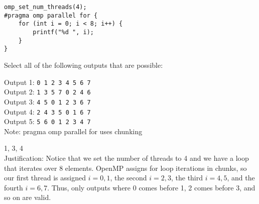 \begin{blocksection}

\question
\begin{verbatim}
omp_set_num_threads(4);
#pragma omp parallel for {
    for (int i = 0; i < 8; i++) {
        printf("%d ", i);
    }
}
\end{verbatim}

Select all of the following outputs that are possible:

Output 1: \texttt{0 1 2 3 4 5 6 7 } \\
Output 2: \texttt{1 3 5 7 0 2 4 6} \\
Output 3: \texttt{4 5 0 1 2 3 6 7} \\
Output 4: \texttt{2 4 3 5 0 1 6 7} \\
Output 5: \texttt{5 6 0 1 2 3 4 7} \\

Note: pragma omp parallel for uses chunking
\begin{solution}[0.5in]
1, 3, 4 \\
Justification: Notice that we set the number of threads to 4 and we have a loop that iterates over 8 elements. OpenMP assigns for loop iterations in chunks, so our first thread is assigned $i=0,1$, the second $i=2,3$, the third $i=4,5$, and the fourth $i=6,7$. Thus, only outputs where 0 comes before 1, 2 comes before 3, and so on are valid.

\end{solution}
\end{blocksection}